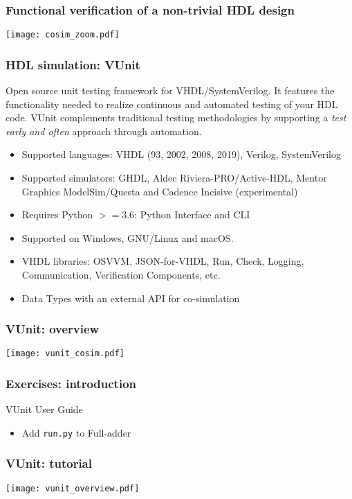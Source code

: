 \documentclass[xcolor={usenames,dvipsnames,svgnames}]{beamer}
\begin{document}
\begin{frame}
\frametitle{Functional verification of a non-trivial HDL design}
\centering
\texttt{[image: cosim\_zoom.pdf]}
\end{frame}

\begin{frame}
\frametitle{HDL simulation: VUnit}
\small
Open source unit testing framework for VHDL/SystemVerilog. It features the functionality needed to realize continuous and automated testing of your HDL code. VUnit complements traditional testing methodologies by supporting a \emph{test early and often} approach through automation.
\vfill
\begin{itemize}
  \item Supported languages: VHDL (93, 2002, 2008, 2019), Verilog, SystemVerilog
  \item Supported simulators: GHDL, Aldec Riviera-PRO/Active-HDL, Mentor Graphics ModelSim/Questa and Cadence Incisive (experimental)
  \item Requires Python $>=3.6$: Python Interface and CLI
  \item Supported on Windows, GNU/Linux and macOS.
  \item VHDL libraries: OSVVM, JSON-for-VHDL, Run, Check, Logging, Communication, Verification Components, etc.
  \item Data Types with an external API for co-simulation
\end{itemize}
\end{frame}

\begin{frame}
\frametitle{VUnit: overview}
\centering
\texttt{[image: vunit\_cosim.pdf]}
\end{frame}

\begin{frame}
\frametitle{Exercises: introduction}
\vfill
\begin{center}
VUnit User Guide \href{http://vunit.github.io/user_guide.html}{\faBook}
\end{center}
\vfill
\begin{itemize}
  \item Add \lstinline{run.py} to Full-adder
\end{itemize}
\vfill
\end{frame}

\begin{frame}
\frametitle{VUnit: tutorial}
\centering
\texttt{[image: vunit\_overview.pdf]}
\end{frame}
\end{document}
